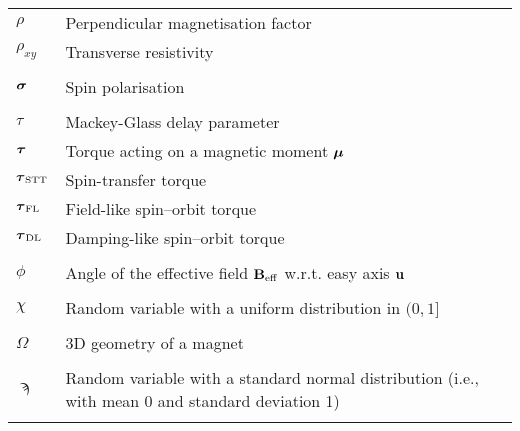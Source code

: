 \begin{longtable}[l]{p{60pt} p{350pt}}
	$\rho$ & Perpendicular magnetisation factor \\
	$\rho_{xy}$ & Transverse resistivity \\
	&\\
	
	$\boldsymbol{\mathbf{\sigma}}$ & Spin polarisation \\
	&\\

	$\tau$ & Mackey-Glass delay parameter \\
	$\boldsymbol{\mathbf{\tau}}$ & Torque acting on a magnetic moment $\boldsymbol{\mathbf{\mu}}$ \\
	$\boldsymbol{\mathbf{\tau}}_\mathrm{STT}$ & Spin-transfer torque \\
	$\boldsymbol{\mathbf{\tau}}_\mathrm{FL}$ & Field-like spin--orbit torque \\
	$\boldsymbol{\mathbf{\tau}}_\mathrm{DL}$ & Damping-like spin--orbit torque \\
	&\\

	$\phi$ & Angle of the effective field $\boldsymbol{\mathbf{B}}_\mathrm{eff}$ w.r.t. easy axis $\boldsymbol{\mathbf{u}}$ \\
	&\\

	$\chi$ & Random variable with a uniform distribution in $(0, 1]$ \\
	&\\
	
	$\Omega$ & 3D geometry of a magnet \\
	&\\
	
	$\sampi$ & Random variable with a standard normal distribution (i.e., with mean 0 and standard deviation 1) \\
	&\\
\end{longtable}
